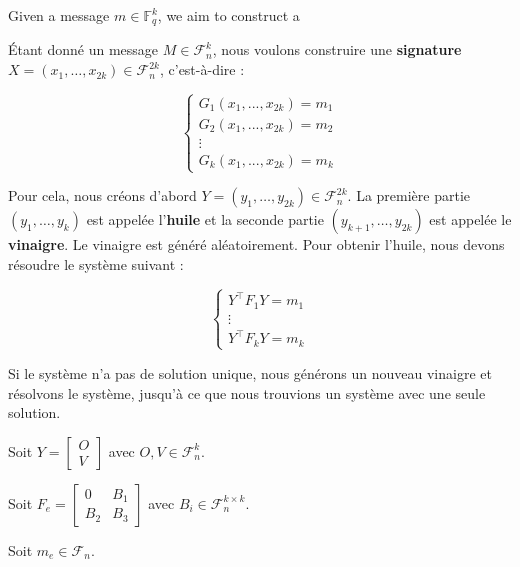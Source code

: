 \documentclass[12pt, a4paper]{article}
\begin{document}
	Given a message $m \in \mathbb{F}_q^{k}$, we aim to construct a 
	
	Étant donné un message $M \in \mathcal{F}_n^k$, nous voulons construire une \textbf{signature} $X = (x_1, \dots, x_{2k}) \in \mathcal{F}_n^{2k}$, c'est-à-dire :
	
	$$
	\begin{cases}
		G_1(x_1,...,x_{2k}) = m_1 \\
		G_2(x_1,...,x_{2k}) = m_2 \\
		\vdots \\
		G_k(x_1,...,x_{2k}) = m_k
	\end{cases}
	$$
	
	Pour cela, nous créons d'abord $Y = (y_1, \dots, y_{2k}) \in \mathcal{F}_n^{2k}$. La première partie $(y_1, \dots, y_k)$ est appelée l'\textbf{huile} et la seconde partie $(y_{k + 1}, \dots, y_{2k})$ est appelée le \textbf{vinaigre}. Le vinaigre est généré aléatoirement. Pour obtenir l'huile, nous devons résoudre le système suivant :
	
	$$
	\begin{cases}
		Y^\top F_1 Y = m_1 \\
		\vdots \\
		Y^\top F_k Y = m_k
	\end{cases}
	$$
	
	Si le système n'a pas de solution unique, nous générons un nouveau vinaigre et résolvons le système, jusqu'à ce que nous trouvions un système avec une seule solution.
	
	Soit $Y = \begin{bmatrix} O \\ V \end{bmatrix}$ avec $O, V \in \mathcal{F}_n^k$.
	
	Soit $F_e =
	\begin{bmatrix}
		0 & B_1 \\
		B_2 & B_3
	\end{bmatrix}$ avec $B_i \in \mathcal{F}_n^{k \times k}$.
	
	Soit $m_e \in \mathcal{F}_n$.
	
\end{document}
